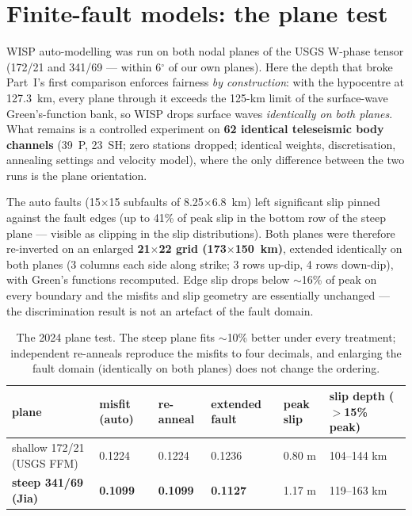 \documentclass[11pt]{article}
\begin{document}
\section{Finite-fault models: the plane test}
\label{sec:planetest2024}
WISP auto-modelling was run on both nodal planes of the USGS W-phase tensor (172/21 and
341/69 --- within 6$^\circ$ of our own planes). Here the depth that broke Part~I's first
comparison enforces fairness \emph{by construction}: with the hypocentre at 127.3~km, every
plane through it exceeds the 125-km limit of the surface-wave Green's-function bank, so WISP
drops surface waves \emph{identically on both planes}. What remains is a controlled
experiment on \textbf{62 identical teleseismic body channels} (39~P, 23~SH; zero stations
dropped; identical weights, discretisation, annealing settings and velocity model), where the
only difference between the two runs is the plane orientation.

The auto faults (15$\times$15 subfaults of 8.25$\times$6.8~km) left significant slip pinned
against the fault edges (up to 41\% of peak slip in the bottom row of the steep plane ---
visible as clipping in the slip distributions). Both planes were therefore re-inverted on an
enlarged \textbf{21$\times$22 grid (173$\times$150~km)}, extended identically on both planes
(3 columns each side along strike; 3 rows up-dip, 4 rows down-dip), with Green's functions
recomputed. Edge slip drops below $\sim$16\% of peak on every boundary and the misfits and
slip geometry are essentially unchanged --- the discrimination result is not an artefact of
the fault domain.

\begin{table}[H]\centering\small
\begin{tabular}{llllll}
\toprule
plane & misfit (auto) & re-anneal & extended fault & peak slip & slip depth ($>$15\% peak) \\
\midrule
shallow 172/21 (USGS FFM) & 0.1224 & 0.1224 & 0.1236 & 0.80 m & 104--144 km \\
\textbf{steep 341/69 (Jia)} & \textbf{0.1099} & \textbf{0.1099} & \textbf{0.1127} & 1.17 m & 119--163 km \\
\bottomrule
\end{tabular}
\caption{The 2024 plane test. The steep plane fits $\sim$10\% better under every treatment;
independent re-anneals reproduce the misfits to four decimals, and enlarging the fault domain
(identically on both planes) does not change the ordering.}
\label{tab:plane2024}
\end{table}
\end{document}
